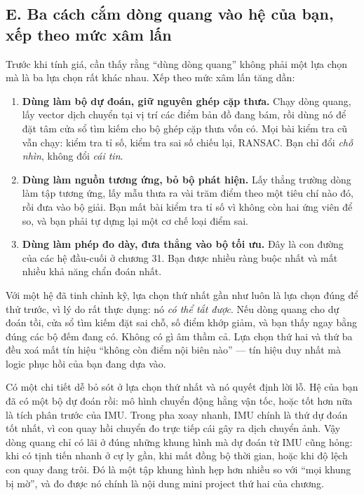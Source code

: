 \documentclass[../../deep_learning.tex]{subfiles}
\begin{document}
\subsection{E. Ba cách cắm dòng quang vào hệ của bạn, xếp theo mức xâm lấn}
Trước khi tính giá, cần thấy rằng ``dùng dòng quang'' không phải một lựa chọn mà là ba lựa chọn rất khác nhau. Xếp theo mức xâm lấn tăng dần:

\begin{enumerate}
\item \textbf{Dùng làm bộ dự đoán, giữ nguyên ghép cặp thưa.} Chạy dòng quang, lấy vector dịch chuyển tại vị trí các điểm bản đồ đang bám, rồi dùng nó để đặt tâm cửa sổ tìm kiếm cho bộ ghép cặp thưa vốn có. Mọi bài kiểm tra cũ vẫn chạy: kiểm tra tỉ số, kiểm tra sai số chiếu lại, RANSAC. Bạn chỉ đổi \emph{chỗ nhìn}, không đổi \emph{cái tin}.
\item \textbf{Dùng làm nguồn tương ứng, bỏ bộ phát hiện.} Lấy thẳng trường dòng làm tập tương ứng, lấy mẫu thưa ra vài trăm điểm theo một tiêu chí nào đó, rồi đưa vào bộ giải. Bạn mất bài kiểm tra tỉ số vì không còn hai ứng viên để so, và bạn phải tự dựng lại một cơ chế loại điểm sai.
\item \textbf{Dùng làm phép đo dày, đưa thẳng vào bộ tối ưu.} Đây là con đường của các hệ đầu-cuối ở chương 31. Bạn được nhiều ràng buộc nhất và mất nhiều khả năng chẩn đoán nhất.
\end{enumerate}

Với một hệ đã tinh chỉnh kỹ, lựa chọn thứ nhất gần như luôn là lựa chọn đúng để thử trước, vì lý do rất thực dụng: nó \emph{có thể tắt được}. Nếu dòng quang cho dự đoán tồi, cửa sổ tìm kiếm đặt sai chỗ, số điểm khớp giảm, và bạn thấy ngay bằng đúng các bộ đếm đang có. Không có gì âm thầm cả. Lựa chọn thứ hai và thứ ba đều xoá mất tín hiệu ``không còn điểm nội biên nào'' --- tín hiệu duy nhất mà logic phục hồi của bạn đang dựa vào.

Có một chi tiết dễ bỏ sót ở lựa chọn thứ nhất và nó quyết định lời lỗ. Hệ của bạn đã có một bộ dự đoán rồi: mô hình chuyển động hằng vận tốc, hoặc tốt hơn nữa là tích phân trước của IMU. Trong pha xoay nhanh, IMU chính là thứ dự đoán tốt nhất, vì con quay hồi chuyển đo trực tiếp cái gây ra dịch chuyển ảnh. Vậy dòng quang chỉ có lãi ở đúng những khung hình mà dự đoán từ IMU cũng hỏng: khi có tịnh tiến nhanh ở cự ly gần, khi mất đồng bộ thời gian, hoặc khi độ lệch con quay đang trôi. Đó là một tập khung hình hẹp hơn nhiều so với ``mọi khung bị mờ'', và đo được nó chính là nội dung mini project thứ hai của chương.
\end{document}
